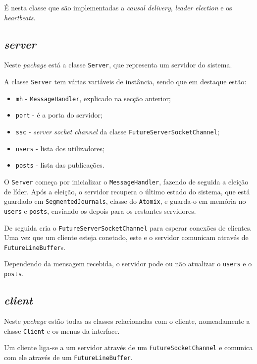 \documentclass[12pt, a4paper]{report}
\begin{document}
É nesta classe que são implementadas a \textit{causal delivery}, \textit{leader election} e os \textit{heartbeats}.


\subsection{\textit{server}}
Neste \textit{package} está a classe \texttt{Server}, que representa um servidor do sistema.

A classe \texttt{Server} tem várias variáveis de instância, sendo que em destaque estão:
\begin{itemize}
    \item \texttt{mh} - \texttt{MessageHandler}, explicado na secção anterior;
    \item \texttt{port} - é a porta do servidor;
    \item \texttt{ssc} - \textit{server socket channel} da classe \texttt{FutureServerSocketChannel};
    \item \texttt{users} - lista dos utilizadores;
    \item \texttt{posts} - lista das publicações.
\end{itemize}

O \texttt{Server} começa por inicializar o \texttt{MessageHandler}, fazendo de seguida a eleição de líder.
Após a eleição, o servidor recupera o último estado do sistema, que está guardado em \texttt{SegmentedJournals}, classe do \texttt{Atomix}, e guarda-o em memória no \texttt{users} e \texttt{posts}, enviando-os depois para os restantes servidores.

De seguida cria o \texttt{FutureServerSocketChannel} para esperar conexões de clientes.
Uma vez que um cliente esteja conetado, este e o servidor comunicam através de \texttt{FutureLineBuffer}s.

Dependendo da mensagem recebida, o servidor pode ou não atualizar o \texttt{users} e o \texttt{posts}.



\subsection{\textit{client}}
Neste \textit{package} estão todas as classes relacionadas com o cliente, nomeadamente a classe \texttt{Client} e os menus da interface.

Um cliente liga-se a um servidor através de um \texttt{FutureSocketChannel} e comunica com ele através de um \texttt{FutureLineBuffer}.
\end{document}
